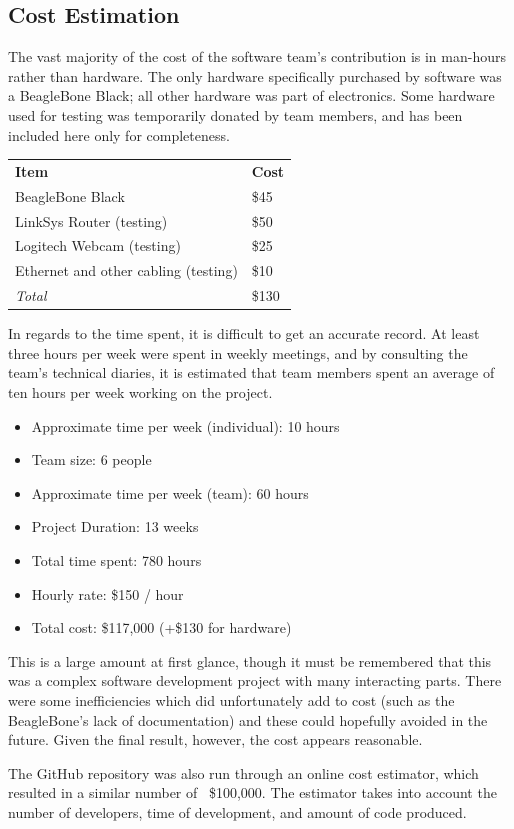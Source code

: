 \subsection{Cost Estimation}

The vast majority of the cost of the software team’s contribution is in man-hours rather than hardware. The only hardware specifically purchased by software was a BeagleBone Black; all other hardware was part of electronics. Some hardware used for testing was temporarily donated by team members, and has been included here only for completeness.

\begin{tabular}{l|l}
	{\bf Item} & {\bf Cost} \\
	BeagleBone Black & \$45 \\
	LinkSys Router (testing) & \$50 \\
	Logitech Webcam (testing) & \$25 \\
	Ethernet and other cabling (testing) & \$10 \\
	\emph{Total} & \$130 
\end{tabular}

In regards to the time spent, it is difficult to get an accurate record. At least three hours per week were spent in weekly meetings, and by consulting the team’s technical diaries, it is estimated that team members spent an average of ten hours per week working on the project.

\begin{itemize}
	\item Approximate time per week (individual): 10 hours
	\item Team size: 6 people 
	\item Approximate time per week (team): 60 hours
	\item Project Duration: 13 weeks
	\item Total time spent: 780 hours 
	\item Hourly rate: \$150 / hour
	\item Total cost: \$117,000 (+\$130 for hardware)
\end{itemize}

This is a large amount at first glance, though it must be remembered that this was a complex software development project with many interacting parts. There were some inefficiencies which did unfortunately add to cost (such as the BeagleBone’s lack of documentation) and these could hopefully avoided in the future. Given the final result, however, the cost appears reasonable.


The GitHub repository was also run through an online cost estimator\cite{ohloh}, which resulted in a similar number of ~\$100,000. The estimator takes into account the number of developers, time of development, and amount of code produced.

